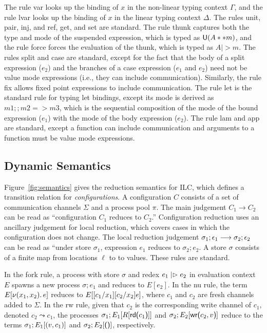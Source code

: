 The rule var looks up the binding of $x$ in the non-linear typing context $\Gamma$,
and the rule lvar looks up the binding of $x$ in the linear typing context
$\Delta$. The rules unit, pair, inj, and ref, get, and set are standard. The rule
thunk captures both the type and mode of the suspended expression, which is
typed as $\textsf{U}(A ** m)$, and the rule force forces the evaluation of the thunk,
which is typed as $A |> m$. The rules split and case are standard, except for
the fact that the body of a \textsf{split} expression ($e_2$) and the branches
of a \textsf{case} expression ($e_1$ and $e_2$) need not be value mode
expressions (i.e., they can include communication). Similarly, the rule fix
allows fixed point expressions to include communication. The rule let is the
standard rule for typing let bindings, except its mode is derived as $m1 ;; m2
=> m3$, which is the sequential composition of the mode of the bound expression
($e_1$) with the mode of the body expression ($e_2$). The rule lam and app are
standard, except a function can include communication and arguments to a
function must be value mode expressions.




\subsection{Dynamic Semantics}
\label{subsec:semantics}



Figure~\ref{fig:semantics} gives the reduction semantics for ILC, which defines
a transition relation for \emph{configurations}. A configuration $C$ consists of
a set of communication channels $\Sigma$ and a process pool $\pi$. The main judgement
$C_1 \longrightarrow C_2$ can be read as ``configuration $C_1$ reduces to $C_2$.''
Configuration reduction uses an ancillary judgement for local reduction, which
covers cases in which the configuration does not change. The local reduction
judgement $\sigma_1; \epsilon_1 \longrightarrow \sigma_2; \epsilon_2$ can be read as ``under store $\sigma_1$,
expression $e_1$ reduces to $\sigma_{2}; e_2$. A store $\sigma$ consists of a finite map
from locations $\ell$ to to values. These rules are standard.

In the fork rule, a process with store $\sigma$ and redex $e_1 \mathrel{|\rhd} e_2$ in
evaluation context $E$ spawns a new process $\sigma; e_1$ and reduces to $E[e_2]$. In
the nu rule, the term $E[ \nu(x_1, x_2).\,e ]$ reduces to $E[
  [c_1/x_1][c_2/x_2]e ]$, where $c_1$ and $c_2$ are fresh
channels added to $\Sigma$. In the rw rule, given that $c_2$ is the corresponding
write channel of $c_1$, denoted $c_2 \leadsto c_1$, the processes $\sigma_1 ; E_1[R[
    \text{\textsf{rd}}\textsf{(}{c_1}\textsf{)}] ]$ and $\sigma_2 ; E_2[ \text{\textsf{wr}}\textsf{(}{c_2},{v}\textsf{)}]$ reduce to the
terms $\sigma_1 ; E_1[ (v, c_1)]$ and $\sigma_2 ; E_2[ \textsf{()}]$, respectively.

\begin{comment}






\end{comment}


